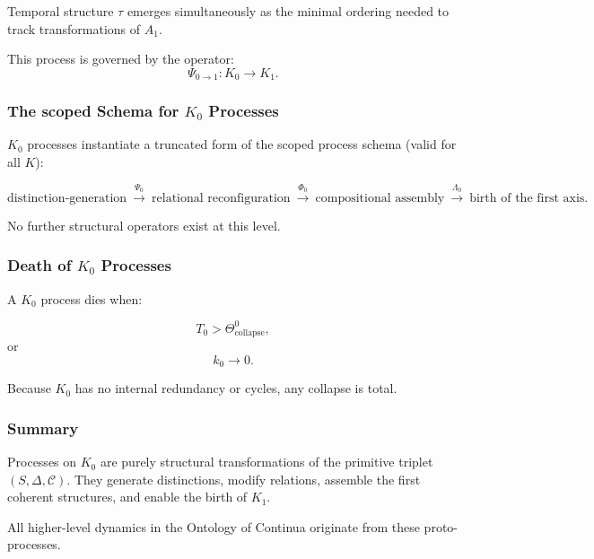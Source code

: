 Temporal structure $\tau$ emerges simultaneously as the minimal ordering
needed to track transformations of $A_1$.

This process is governed by the operator:
\[
\Psi_{0\to1}: K_0 \to K_1.
\]

\subsubsection{The scoped Schema for \texorpdfstring{$K_0$}{K_0} Processes}

$K_0$ processes instantiate a truncated form of the scoped process schema
(valid for all $K$):

\[
\text{distinction-generation}
\ \xrightarrow{\Psi_0}
\ \text{relational reconfiguration}
\ \xrightarrow{\Phi_0}
\ \text{compositional assembly}
\ \xrightarrow{\Lambda_0}
\ \text{birth of the first axis}.
\]

No further structural operators exist at this level.

\subsubsection{Death of \texorpdfstring{$K_0$}{K_0} Processes}

A $K_0$ process dies when:

\[
T_0 > \Theta^0_{\mathrm{collapse}},
\]
or
\[
k_0 \to 0.
\]

Because $K_0$ has no internal redundancy or cycles, any collapse is total.

\subsubsection{Summary}

Processes on $K_0$ are purely structural transformations of the primitive
triplet $(S, \Delta, \mathcal{C})$.
They generate distinctions, modify relations, assemble the first coherent
structures, and enable the birth of $K_1$.

All higher-level dynamics in the Ontology of Continua originate from these
proto-processes.
